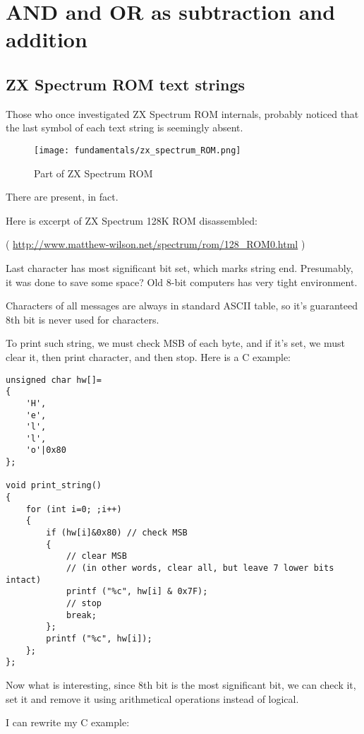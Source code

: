 \section{AND and OR as subtraction and addition}

\subsection{ZX Spectrum ROM text strings}
\label{ZX Spectrum}

Those who once investigated ZX Spectrum \ac{ROM} internals, probably noticed that the last symbol of each text string is seemingly
absent.

\begin{figure}[H]
\centering
\texttt{[image: fundamentals/zx\_spectrum\_ROM.png]}
\caption{Part of ZX Spectrum ROM}
\end{figure}

There are present, in fact.

Here is excerpt of ZX Spectrum 128K ROM disassembled:


( \url{http://www.matthew-wilson.net/spectrum/rom/128_ROM0.html} )

Last character has most significant bit set, which marks string end.
Presumably, it was done to save some space?
Old 8-bit computers has very tight environment.

Characters of all messages are always in standard ASCII table, so it's guaranteed 8th bit is never used for characters.

To print such string, we must check \ac{MSB} of each byte, and if it's set, we must clear it, then print character,
and then stop.
Here is a C example:

\begin{lstlisting}[style=customc]
unsigned char hw[]=
{
	'H',
	'e',
	'l',
	'l',
	'o'|0x80
};

void print_string()
{
	for (int i=0; ;i++)
	{
		if (hw[i]&0x80) // check MSB
		{
			// clear MSB
			// (in other words, clear all, but leave 7 lower bits intact)
			printf ("%c", hw[i] & 0x7F);
			// stop
			break;
		};
		printf ("%c", hw[i]);
	};
};
\end{lstlisting}

Now what is interesting, since 8th bit is the most significant bit, we can check it, set it and remove it using
arithmetical operations instead of logical.

I can rewrite my C example:

